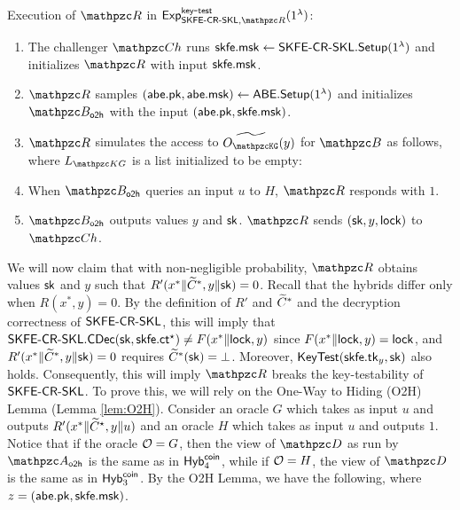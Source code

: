 \begin{description}
\item Execution of $\qR$ in
$\expb{\SKFESKL,\qR}{key}{test}(1^\secp)$:

\begin{enumerate}
\item The challenger $\qCh$ runs $\mathsf{skfe}.\mathsf{msk} \leftarrow
\mathsf{SKFE}\textrm{-}\mathsf{CR}\textrm{-}\mathsf{SKL}.\mathsf{Setup}(1^\lambda)$ and
initializes $\qR$ with input $\mathsf{skfe}.\mathsf{msk}$.
\item $\qR$ samples $(\mathsf{abe}.\mathsf{pk}, \mathsf{abe}.\mathsf{msk}) \leftarrow
\mathsf{ABE}.\mathsf{Setup}(1^\lambda)$ and initializes $\qB_\oh$ with the input
$(\mathsf{abe}.\mathsf{pk}, \mathsf{skfe}.\mathsf{msk})$.
\item $\qR$ simulates the access to $\widetilde{\Oracle{\qKG}}(y)$ for $\qB$ as
follows, where $L_{\qKG}$ is a list initialized to be empty:

\item When $\qB_\oh$ queries an input $u$ to $H$, $\qR$ responds with $1$.

\item $\qB_\oh$ outputs values $y$ and $\mathsf{sk}$. $\qR$ sends $(\mathsf{sk}, y,
\mathsf{lock})$ to $\qCh$.

\end{enumerate}
\end{description}

We will now claim that with non-negligible probability, $\qR$ obtains
values $\mathsf{sk}$ and $y$ such that $R'(x^* \| \widetilde{C}^*,y \| \mathsf{sk}) = 0$.  Recall that
the hybrids differ only when $R(x^*, y) = 0$.  By the definition of
$R'$ and $\widetilde{C}^*$ and the decryption correctness of $\mathsf{SKFE}\textrm{-}\mathsf{CR}\textrm{-}\mathsf{SKL}$, this
will imply that $\mathsf{SKFE}\textrm{-}\mathsf{CR}\textrm{-}\mathsf{SKL}.\mathsf{CDec}(\mathsf{sk}, \mathsf{skfe}.\mathsf{ct}^\star) \neq
F(x^*\|\mathsf{lock},y)$ since $F(x^* \| \mathsf{lock}, y) = \mathsf{lock}$, and $R'(x^* \| \widetilde{C}^*,y \| \mathsf{sk}) = 0$ requires $\widetilde{C}^*(\mathsf{sk})=\bot$. Moreover,
$\mathsf{KeyTest}(\mathsf{skfe}.\mathsf{tk}_y, \mathsf{sk})$ also holds. Consequently, this will imply
$\qR$ breaks the key-testability of $\mathsf{SKFE}\textrm{-}\mathsf{CR}\textrm{-}\mathsf{SKL}$. To prove this, we will
rely on the One-Way to Hiding (O2H) Lemma (Lemma \ref{lem:O2H}).
Consider an oracle $G$ which takes as input $u$ and outputs $R'(x^* \|
\widetilde{C}^\star, y\|u)$ and an oracle $H$ which takes as input $u$ and
outputs $1$. Notice that if the oracle $\mathcal{O} = G$, then the view of
$\qD$ as run by $\qA_\oh$ is the same as in $\mathsf{Hyb}_4^{\mathsf{coin}}$, while if $\mathcal{O} = H$, the view
of $\qD$ is the same as in $\mathsf{Hyb}_3^{\mathsf{coin}}$. By the O2H Lemma, we
have the following, where $z = (\mathsf{abe}.\mathsf{pk}, \mathsf{skfe}.\mathsf{msk})$.

